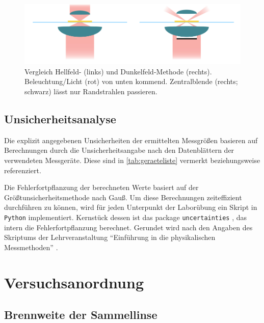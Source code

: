 \documentclass[ngerman]{scrartcl}
\begin{document}
\begin{figure}[H]
    \centering
    \begin{samepage}
        \includegraphics[width=\linewidth]{fig/Hell_vs_Dunkelfeld.png}
        \caption[Aufbau eines Dunkelfeldmikroskop]{Vergleich Hellfeld- (links) und Dunkelfeld-Methode (rechts). Beleuchtung/Licht (rot) von unten kommend. Zentralblende (rechts; schwarz) lässt nur Randstrahlen passieren.}
        \label{fig:dunkelfeld_skizze}
    \end{samepage}
\end{figure}


\subsection{Unsicherheitsanalyse}
\label{subsec:unsicherheitsanalyse}

Die explizit angegebenen Unsicherheiten der ermittelten Messgrößen basieren auf Berechnungen durch die Unsicherheitsangabe nach den Datenblättern der verwendeten Messgeräte. Diese sind in \autoref{tab:geraeteliste} vermerkt beziehungsweise referenziert.

Die Fehlerfortpflanzung der berechneten Werte basiert auf der Größtunsicherheitsmethode nach Gauß. Um diese Berechnungen zeiteffizient durchführen zu können, wird für jeden Unterpunkt der Laborübung ein Skript in \verb!Python! implementiert. Kernstück dessen ist das package \verb!uncertainties! \cite{ref:uncertainties}, das intern die Fehlerfortpflanzung berechnet. Gerundet wird nach den Angaben des Skriptums der Lehrveranstaltung \enquote{Einführung in die physikalischen Messmethoden} \cite{ref:messmethoden}.



\section{Versuchsanordnung}
\label{sec:versuchsanordnung}

\subsection{Brennweite der Sammellinse}
\label{subsec:versuchsanordnung_sammellinse}
\end{document}

